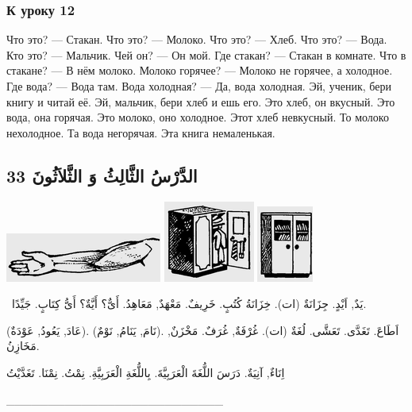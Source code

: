 \documentclass[a5paper]{article}
\begin{document}
\subsubsection{К уроку 12}
Что это? — Стакан. Что это? — Молоко. Что это? — Хлеб. Что это? — Вода. Кто это? — Мальчик. Чей он? — Он мой. Где ста­кан? — Стакан в комнате. Что в стакане? — В нём молоко. Молоко горячее? — Молоко не горячее, а холодное. Где вода? — Вода там. Вода холодная? — Да, вода холодная. Эй, ученик, бери книгу и читай её. Эй, мальчик, бери хлеб и ешь его. Это хлеб, он вкусный. Это вода, она горячая. Это молоко, оно холодное. Этот хлеб невкусный. То молоко нехолодное. Та вода негорячая. Эта книга немаленькая.

\subsection{الدَّرْسُ الثَّالِثُ وَ الثَّلاَثُونَ 33}
 \includegraphics[width=2.0209in,height=0.6354in]{MuhammadBagauddinlatinized-img073.png}   \includegraphics[width=1.1772in,height=1.052in]{MuhammadBagauddinlatinized-img074.png}   \includegraphics[width=0.7291in,height=0.9898in]{MuhammadBagauddinlatinized-img075.png} 

\ يَدٌ, اَيْدٍ. جِزَانَةٌ (ات). خِزَانَةُ كُتُبٍ. خَرِيفٌ. مَعْهَدٌ, مَعَاهِدُ. أَىٌّ؟ أَيَّةٌ؟ أَىُّ كِتَابٍ. جَيِّدًا. 

(عَادَ, يَعُودُ, عَوْدَةٌ). (نَامَ, يَنَامُ, نَوْمٌ). اَطَاعَ. تَغَدَّى. تَعَشَّى. لُغَةٌ (ات). غُرْفَةٌ, غُرَفٌ. مَخْزَنٌ, مَخَازِنُ. 

اِنَاءٌ, آنِيَةٌ. دَرَسَ اللُّغَةَ الْعَرَبِيَّةَ. بِاللُّغَةِ الْعَرَبِيَّةِ. نِمْتُ. نِمْنَا. تَغَدَّيْتُ

\_\_\_\_\_\_\_\_\_\_\_\_\_\_\_\_\_\_\_\_\_\_\_\_\_\_
\end{document}
